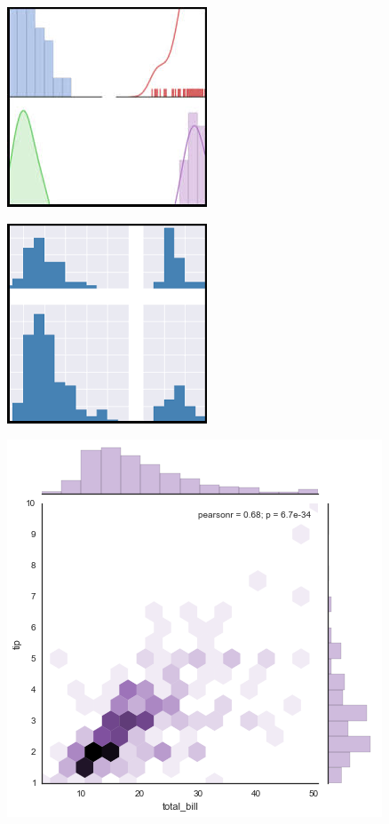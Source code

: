 \documentclass[]{article}
\begin{document}
\begin{figure}
\centering
\includegraphics[width=0.7\linewidth]{seaborn2}
\caption{}
\label{fig:seaborn2}
\end{figure}
\begin{figure}
\centering
\includegraphics[width=0.7\linewidth]{seaborn3}
\caption{}
\label{fig:seaborn3}
\end{figure}
\begin{figure}
\centering
\includegraphics[width=0.7\linewidth]{seaborn4}
\caption{}
\label{fig:seaborn4}
\end{figure}
\end{document}

